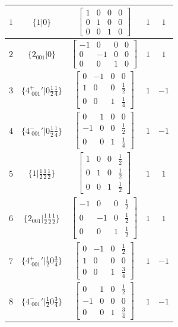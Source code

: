 \documentclass[fleqn,8pt]{jsarticle}
\begin{document}
\begin{longtable}{ccccc}
$ 1 $ & $ \{1|0\} $ & $ \begin{bmatrix} 1 & 0 & 0 & 0 \\ 0 & 1 & 0 & 0 \\ 0 & 0 & 1 & 0 \end{bmatrix} $ & $ 1 $ & $ 1 $ \\ \hline
$ 2 $ & $ \{2{}_{001}|0\} $ & $ \begin{bmatrix} -1 & 0 & 0 & 0 \\ 0 & -1 & 0 & 0 \\ 0 & 0 & 1 & 0 \end{bmatrix} $ & $ 1 $ & $ 1 $ \\ \hline
$ 3 $ & $ \{4^{+}_{\,\,001}{}'|0 \frac{1}{2} \frac{1}{4}\} $ & $ \begin{bmatrix} 0 & -1 & 0 & 0 \\ 1 & 0 & 0 & \frac{1}{2} \\ 0 & 0 & 1 & \frac{1}{4} \end{bmatrix} $ & $ 1 $ & $ -1 $ \\ \hline
$ 4 $ & $ \{4^{-}_{\,\,001}{}'|0 \frac{1}{2} \frac{1}{4}\} $ & $ \begin{bmatrix} 0 & 1 & 0 & 0 \\ -1 & 0 & 0 & \frac{1}{2} \\ 0 & 0 & 1 & \frac{1}{4} \end{bmatrix} $ & $ 1 $ & $ -1 $ \\ \hline
$ 5 $ & $ \{1|\frac{1}{2} \frac{1}{2} \frac{1}{2}\} $ & $ \begin{bmatrix} 1 & 0 & 0 & \frac{1}{2} \\ 0 & 1 & 0 & \frac{1}{2} \\ 0 & 0 & 1 & \frac{1}{2} \end{bmatrix} $ & $ 1 $ & $ 1 $ \\ \hline
$ 6 $ & $ \{2{}_{001}|\frac{1}{2} \frac{1}{2} \frac{1}{2}\} $ & $ \begin{bmatrix} -1 & 0 & 0 & \frac{1}{2} \\ 0 & -1 & 0 & \frac{1}{2} \\ 0 & 0 & 1 & \frac{1}{2} \end{bmatrix} $ & $ 1 $ & $ 1 $ \\ \hline
$ 7 $ & $ \{4^{+}_{\,\,001}{}'|\frac{1}{2} 0 \frac{3}{4}\} $ & $ \begin{bmatrix} 0 & -1 & 0 & \frac{1}{2} \\ 1 & 0 & 0 & 0 \\ 0 & 0 & 1 & \frac{3}{4} \end{bmatrix} $ & $ 1 $ & $ -1 $ \\ \hline
$ 8 $ & $ \{4^{-}_{\,\,001}{}'|\frac{1}{2} 0 \frac{3}{4}\} $ & $ \begin{bmatrix} 0 & 1 & 0 & \frac{1}{2} \\ -1 & 0 & 0 & 0 \\ 0 & 0 & 1 & \frac{3}{4} \end{bmatrix} $ & $ 1 $ & $ -1 $ \\
\end{longtable}
\end{document}
